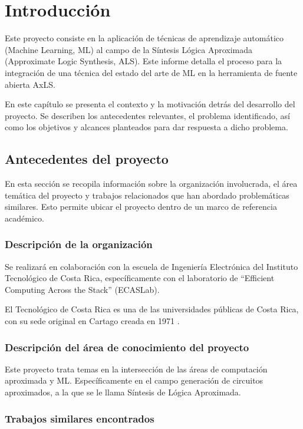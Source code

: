 \chapter{Introducción}

Este proyecto consiste en la aplicación de técnicas de aprendizaje automático
(Machine Learning, ML) al campo de la Síntesis Lógica Aproximada (Approximate
Logic Synthesis, ALS).
Este informe detalla el proceso para la integración de una técnica del estado del
arte de ML en la herramienta de fuente abierta AxLS.

En este capítulo se presenta el contexto y la motivación detrás del desarrollo del
proyecto. Se describen los antecedentes relevantes, el problema identificado,
así como los objetivos y alcances planteados para dar respuesta a dicho
problema.

\section{Antecedentes del proyecto}

En esta sección se recopila información sobre la organización
involucrada, el área temática del proyecto y trabajos relacionados que han
abordado problemáticas similares. Esto permite ubicar el proyecto dentro de un
marco de referencia académico.

\subsection{Descripción de la organización}

Se realizará en colaboración con la escuela de Ingeniería Electrónica del
Instituto Tecnológico de Costa Rica, específicamente con el laboratorio de
``Efficient Computing Across the Stack'' (ECASLab).

El Tecnológico de Costa Rica es una de las universidades públicas de Costa
Rica, con su sede original en Cartago creada en 1971 \cite{resena_tec}.

\subsection{Descripción del área de conocimiento del proyecto}

Este proyecto trata temas en la intersección de las áreas de computación
aproximada y ML.
Específicamente en el campo generación de circuitos aproximados, a la
que se le llama Síntesis de Lógica Aproximada.

\subsection{Trabajos similares encontrados}

